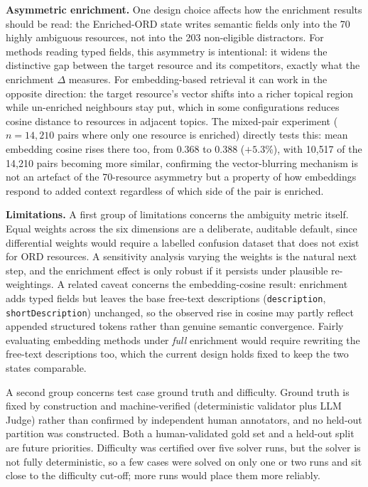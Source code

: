 \documentclass[10pt,twocolumn]{article}
\begin{document}
\textbf{Asymmetric enrichment.} One design choice affects how the enrichment results should be read: the Enriched-ORD state writes semantic fields only into the 70 highly ambiguous resources, not into the 203 non-eligible distractors. For methods reading typed fields, this asymmetry is intentional: it widens the distinctive gap between the target resource and its competitors, exactly what the enrichment $\Delta$ measures. For embedding-based retrieval it can work in the opposite direction: the target resource's vector shifts into a richer topical region while un-enriched neighbours stay put, which in some configurations reduces cosine distance to resources in adjacent topics. The mixed-pair experiment ($n{=}14{,}210$ pairs where only one resource is enriched) directly tests this: mean embedding cosine rises there too, from 0.368 to 0.388 ($+5.3\%$), with 10{,}517 of the 14{,}210 pairs becoming more similar, confirming the vector-blurring mechanism is not an artefact of the 70-resource asymmetry but a property of how embeddings respond to added context regardless of which side of the pair is enriched.

\textbf{Limitations.} A first group of limitations concerns the ambiguity metric itself. Equal weights across the six dimensions are a deliberate, auditable default, since differential weights would require a labelled confusion dataset that does not exist for ORD resources. A sensitivity analysis varying the weights is the natural next step, and the enrichment effect is only robust if it persists under plausible re-weightings. A related caveat concerns the embedding-cosine result: enrichment adds typed fields but leaves the base free-text descriptions (\texttt{description}, \texttt{shortDescription}) unchanged, so the observed rise in cosine may partly reflect appended structured tokens rather than genuine semantic convergence. Fairly evaluating embedding methods under \emph{full} enrichment would require rewriting the free-text descriptions too, which the current design holds fixed to keep the two states comparable.

A second group concerns test case ground truth and difficulty. Ground truth is fixed by construction and machine-verified (deterministic validator plus LLM Judge) rather than confirmed by independent human annotators, and no held-out partition was constructed. Both a human-validated gold set and a held-out split are future priorities. Difficulty was certified over five solver runs, but the solver is not fully deterministic, so a few cases were solved on only one or two runs and sit close to the difficulty cut-off; more runs would place them more reliably.
\end{document}
